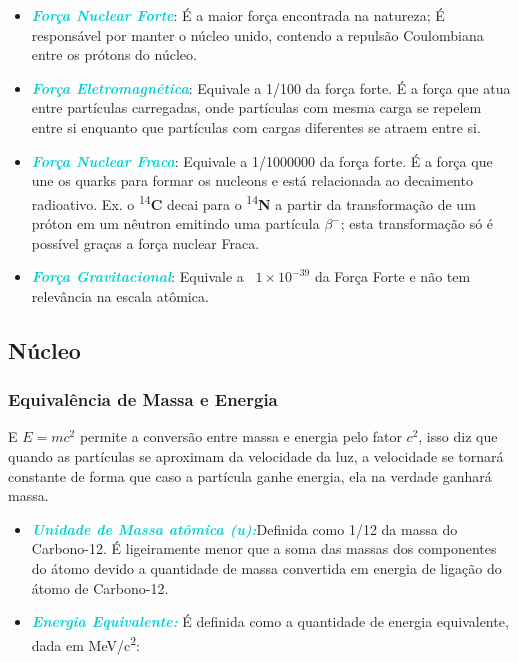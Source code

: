 \documentclass[11pt,a4paper]{article}
\begin{document}
    \begin{itemize}
    	\item \textbf{\textit{\textcolor{DarkTurquoise}{Força Nuclear Forte}}}: É a maior força encontrada na natureza; É responsável por manter o núcleo unido, contendo a repulsão Coulombiana entre os prótons do núcleo.
    	\item \textbf{\textit{\textcolor{DarkTurquoise}{Força Eletromagnética}}}: Equivale a 1/100 da força forte. É a força que atua entre partículas carregadas, onde partículas com mesma carga se repelem entre si enquanto que partículas com cargas diferentes se atraem entre si.
        \item \textbf{\textit{\textcolor{DarkTurquoise}{Força Nuclear Fraca}}}: Equivale a 1/1000000 da força forte. É a força que une os quarks para formar os nucleons e está relacionada ao decaimento radioativo. Ex. o \textsuperscript{14}\textbf{C} decai para o  \textsuperscript{14}\textbf{N} a partir da transformação de um próton em um nêutron emitindo uma partícula $\beta ^-$; esta transformação só é possível graças a força nuclear Fraca.
        \item \textbf{\textit{\textcolor{DarkTurquoise}{Força Gravitacional}}}: Equivale a ~$1 \times 10^{-39}$ da Força Forte e não tem relevância na escala atômica.
    \end{itemize}

\subsection*{Núcleo}

\subsubsection*{Equivalência de Massa e Energia}

    E $E = m c^2$ permite a conversão entre massa e energia pelo fator $c^2$, isso diz que quando as partículas se aproximam da velocidade da luz, a velocidade se tornará constante de forma que caso a partícula ganhe energia, ela na verdade ganhará massa.


    \begin{itemize}
        \item \textbf{\textit{\textcolor{DarkTurquoise}{Unidade de Massa atômica (u):}}}Definida como 1/12 da massa do Carbono-12. É ligeiramente menor que a soma das massas dos componentes do átomo devido a quantidade de massa convertida em energia de ligação do átomo de Carbono-12.  
        \item \textbf{\textit{\textcolor{DarkTurquoise}{Energia Equivalente:}}} É definida como a quantidade de energia equivalente, dada em \unit{MeV/c^2}:
    \end{itemize}
\end{document}
